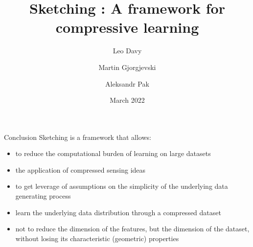 \documentclass{beamer}
\title[Sketching and compressive learning]{Sketching : A framework for compressive learning}
\author[Davy, Gjorgjevski, Pak] %
{Leo Davy \and Martin Gjorgjevski \and Aleksandr Pak}
\institute[ENS Lyon] %
{
  ENS Lyon \\
  M2 Advanced Mathematics}
\date[Short Occasion] %
{March 2022}
\begin{document}
\maketitle










\begin{frame}{Conclusion}
	Sketching is a framework that allows:
	\begin{itemize}
		\item to reduce the computational burden of learning on large datasets
		\item the application of compressed sensing ideas
		\item to get leverage of assumptions on the simplicity of the underlying data generating process
		\item learn the underlying data distribution through a compressed dataset
		\item not to reduce the dimension of the features, but the dimension of the dataset, without losing its characteristic (geometric) properties
	\end{itemize}
\end{frame}
\end{document}
